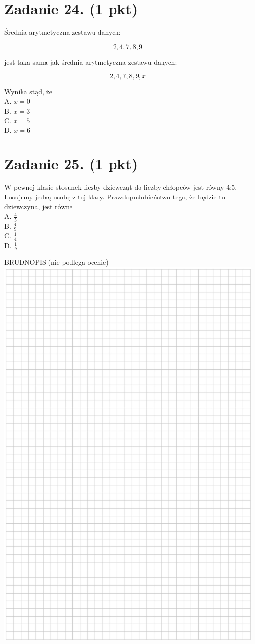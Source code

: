 \documentclass[10pt]{article}
\begin{document}
\section*{Zadanie 24. (1 pkt)}
Średnia arytmetyczna zestawu danych:

\[
2,4,7,8,9
\]

jest taka sama jak średnia arytmetyczna zestawu danych:

\[
2,4,7,8,9, x
\]

Wynika stąd, że\\
A. \(x=0\)\\
B. \(x=3\)\\
C. \(x=5\)\\
D. \(x=6\)

\section*{Zadanie 25. (1 pkt)}
W pewnej klasie stosunek liczby dziewcząt do liczby chłopców jest równy 4:5. Losujemy jedną osobę z tej klasy. Prawdopodobieństwo tego, że będzie to dziewczyna, jest równe\\
A. \(\frac{4}{5}\)\\
B. \(\frac{4}{9}\)\\
C. \(\frac{1}{4}\)\\
D. \(\frac{1}{9}\)

BRUDNOPIS (nie podlega ocenie)\\
\includegraphics[max width=\textwidth, center]{2024_11_21_e19607c15353cb4d7e48g-11}
\end{document}
